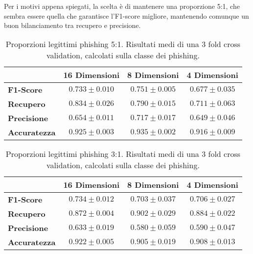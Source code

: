 \documentclass[../../main.tex]{subfiles}
\begin{document}
    Per i motivi appena spiegati, la scelta è di mantenere una proporzione 5:1, che sembra essere quella che garantisce l'F1-score migliore, mantenendo comunque un buon bilanciamento tra recupero e precisione.


    \begin{table}[H]
        \centering
        \begin{tabular}{lccc}
            \toprule
            {} &                      \textbf{16 Dimensioni} & \textbf{8 Dimensioni} & \textbf{4 Dimensioni} \\
            \midrule
            \textbf{F1-Score }      &      $0.733 \pm 0.010$ & $0.751 \pm 0.005$ & $0.677 \pm 0.035$\\
            \textbf{Recupero   }    &      $0.834 \pm 0.026$ & $0.790 \pm 0.015$ & $0.711 \pm 0.063$\\
            \textbf{Precisione}     &      $0.654 \pm 0.011$ & $0.717 \pm 0.017$ & $0.649 \pm 0.046$\\
            \textbf{Accuratezza }   &      $0.925 \pm 0.003$ & $0.935 \pm 0.002$ & $0.916 \pm 0.009$\\
            \bottomrule
        \end{tabular}
        \caption{Proporzioni legittimi phishing 5:1. Risultati medi di una 3 fold cross validation, calcolati sulla classe dei phishing.}
        \label{tab:5a1Undersampling}
    \end{table}

    \begin{table}[H]
        \centering
        \begin{tabular}{lccc}
            \toprule
            {} &                      \textbf{16 Dimensioni} & \textbf{8 Dimensioni} & \textbf{4 Dimensioni} \\
            \midrule
            \textbf{F1-Score }      &      $0.734 \pm 0.012$ & $0.703 \pm 0.037$ & $0.706 \pm 0.027$\\
            \textbf{Recupero   }    &      $0.872 \pm 0.004$ & $0.902 \pm 0.029$ & $0.884 \pm 0.022$\\
            \textbf{Precisione}     &      $0.633 \pm 0.019$ & $0.580 \pm 0.059$ & $0.590 \pm 0.047$\\
            \textbf{Accuratezza }   &      $0.922 \pm 0.005$ & $0.905 \pm 0.019$ & $0.908 \pm 0.013$\\
            \bottomrule
        \end{tabular}     
        \caption{Proporzioni legittimi phishing 3:1. Risultati medi di una 3 fold cross validation, calcolati sulla classe dei phishing.}   
        \label{tab:3a1Undersampling}
    \end{table}
\end{document}
